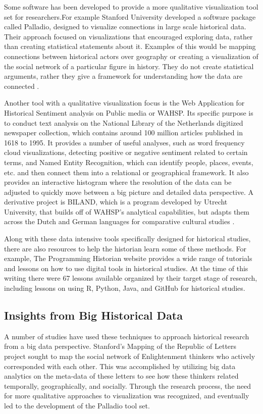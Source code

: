 \documentclass[sigconf]{acmart}
\begin{document}
Some software has been developed to provide a more qualitative visualization tool set for researchers.For example Stanford University developed a software package called Palladio, designed to visualize connections in large scale historical data. Their approach focused on visualizations that encouraged exploring data, rather than creating statistical statements about it. Examples of this would be mapping connections between historical actors over geography or creating a visualization of the social network of a particular figure in history. They do not create statistical arguments, rather they give a framework for understanding how the data are connected \cite{palladio}.

Another tool with a qualitative visualization focus is the Web Application for Historical Sentiment analysis on Public media or WAHSP. Its specific purpose is to conduct text analysis on the National Library of the Netherlands digitized newspaper collection, which contains around 100 million articles published in 1618 to 1995. It provides a number of useful analyses, such as word frequency cloud visualizations, detecting positive or negative sentiment related to certain terms, and Named Entity Recognition, which can identify people, places, events, etc. and then connect them into a relational or geographical framework. It also provides an interactive histogram where the resolution of the data can be adjusted to quickly move between a big picture and detailed data perspective. A derivative project is BILAND, which is a program developed by Utrecht University, that builds off of WAHSP's analytical capabilities, but adapts them across the Dutch and German languages for comparative cultural studies \cite{bdglobalhist}.

Along with these data intensive tools specifically designed for historical studies, there are also resources to help the historian learn some of these methods. For example, The Programming Historian website provides a wide range of tutorials and lessons on how to use digital tools in historical studies. At the time of this writing there were 67 lessons available organized by their target stage of research, including lessons on using R, Python, Java, and GitHub for historical studies\cite{proghistabout}.

\subsection{Insights from Big Historical Data}

A number of studies have used these techniques to approach historical research from a big data perspective. Stanford's Mapping of the Republic of Letters project sought to map the social network of Enlightenment thinkers who actively corresponded with each other. This was accomplished by utilizing big data analytics on the meta-data of these letters to see how these thinkers related temporally, geographically, and socially. Through the research process, the need for more qualitative approaches to visualization was recognized, and eventually led to the development of the Palladio tool set. 
\end{document}
